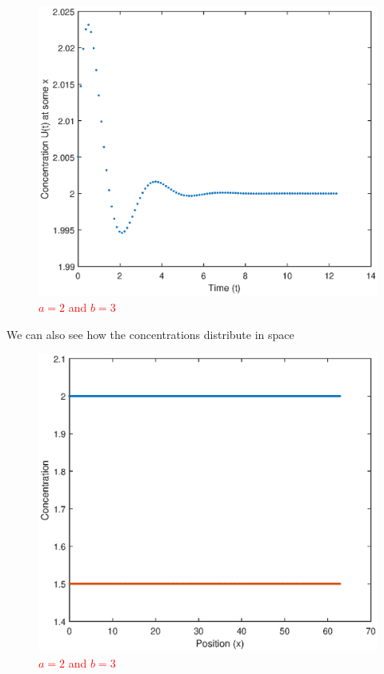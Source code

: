 \documentclass{book}
\theoremstyle{definition}
\begin{document}
\begin{figure}[!htb]
	\centering
	\includegraphics[scale=0.6]{Turing_patterns/Turing_1.eps}
	\caption{\textcolor{red}{$a = 2$ and $b=3$}}
	\label{Fig:17}
\end{figure}


We can also see how the concentrations distribute in space 
\begin{figure}[!htb]
	\centering
	\includegraphics[scale=0.6]{Turing_patterns/Turing_2.eps}
	\caption{\textcolor{red}{$a = 2$ and $b=3$}}
	\label{Fig:18}
\end{figure}
\end{document}
